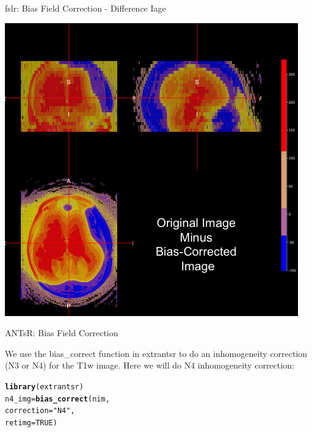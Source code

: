 \documentclass[11pt]{beamer}\usepackage[]{graphicx}\usepackage[]{color}
\makeatletter
\newcommand{\hlnum}[1]{\textcolor[rgb]{0.686,0.059,0.569}{#1}}%
\newcommand{\hlstr}[1]{\textcolor[rgb]{0.192,0.494,0.8}{#1}}%
\newcommand{\hlstd}[1]{\textcolor[rgb]{0.345,0.345,0.345}{#1}}%
\newcommand{\hlkwb}[1]{\textcolor[rgb]{0.69,0.353,0.396}{#1}}%
\newcommand{\hlkwc}[1]{\textcolor[rgb]{0.333,0.667,0.333}{#1}}%
\newcommand{\hlkwd}[1]{\textcolor[rgb]{0.737,0.353,0.396}{\textbf{#1}}}%
\newenvironment{kframe}{%
 \def\at@end@of@kframe{}%
 \ifinner\ifhmode%
  \def\at@end@of@kframe{\end{minipage}}%
  \begin{minipage}{\columnwidth}%
 \fi\fi%
 \def\FrameCommand##1{\hskip\@totalleftmargin \hskip-\fboxsep
 \colorbox{shadecolor}{##1}\hskip-\fboxsep
     \hskip-\linewidth \hskip-\@totalleftmargin \hskip\columnwidth}%
 \MakeFramed {\advance\hsize-\width
   \@totalleftmargin\z@ \linewidth\hsize
   \@setminipage}}%
 {\par\unskip\endMakeFramed%
 \at@end@of@kframe}
\newenvironment{knitrout}{}{} %
\makeatother
\begin{document}
\begin{frame}[fragile]{fslr: Bias Field Correction - Difference Iage}

\includegraphics[width=0.5\linewidth]{FAST_Diff_Image.png}

\end{frame}



\begin{frame}[fragile]{ANTsR: Bias Field Correction}

We use the bias_correct function in extrantsr to do an inhomogeneity correction (N3 or N4) for  the T1w image.  Here we will do N4 inhomogeneity correction:

\begin{knitrout}
\color{fgcolor}\begin{kframe}
\begin{alltt}
\hlkwd{library}\hlstd{(extrantsr)}
\hlstd{n4_img} \hlkwb{=} \hlkwd{bias_correct}\hlstd{(nim,}
                      \hlkwc{correction} \hlstd{=} \hlstr{"N4"}\hlstd{,}
                      \hlkwc{retimg}\hlstd{=}\hlnum{TRUE}\hlstd{)}
\end{alltt}
\end{kframe}
\end{knitrout}
\end{frame}
\end{document}
